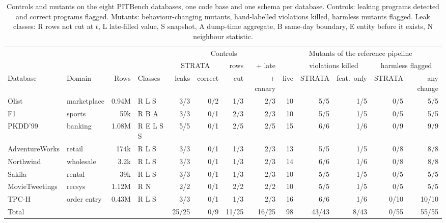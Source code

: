 \documentclass[10pt,conference]{IEEEtran}
\newcommand{\tool}{STRATA}
\begin{document}
\begin{table}[t]
\centering\footnotesize
\setlength{\tabcolsep}{4.5pt}
\caption{Controls and mutants on the eight PITBench databases, one code
base and one schema per database. Controls: leaking programs detected and
correct programs flagged. Mutants: behaviour-changing mutants, hand-labelled
violations killed, harmless mutants flagged. Leak classes: R rows not cut at
$t$, L late-filled value, S snapshot, A dump-time aggregate, B same-day
boundary, E entity before it exists, N neighbour statistic.}
\label{tab:pitbench}
\begin{tabular}{@{}llrl rrrr r rr rr@{}}
\toprule
& & & & \multicolumn{4}{c}{Controls} & \multicolumn{5}{c}{Mutants of the reference pipeline} \\
\cmidrule(lr){5-8}\cmidrule(l){9-13}
& & & & \multicolumn{2}{c}{\tool} & rows & + late & & \multicolumn{2}{c}{violations killed} & \multicolumn{2}{c}{harmless flagged} \\
\cmidrule(lr){5-6}\cmidrule(lr){10-11}\cmidrule(l){12-13}
Database & Domain & Rows & Classes & leaks & correct & cut & + canary & live & \tool & feat.\ only & \tool & any change \\
\midrule
Olist          & marketplace  & 0.94M & R L S       & 3/3 & 0/2 & 1/3  & 2/3  & 10 & 5/5   & 1/5  & 0/5  & 5/5   \\
F1             & sports       & 59k   & R B A       & 3/3 & 0/1 & 2/3  & 2/3  & 10 & 5/5   & 1/5  & 0/5  & 5/5   \\
PKDD'99        & banking      & 1.08M & R E L S S   & 5/5 & 0/1 & 2/5  & 2/5  & 15 & 6/6   & 1/6  & 0/9  & 9/9   \\
AdventureWorks & retail       & 174k  & R L S       & 3/3 & 0/1 & 1/3  & 2/3  & 13 & 5/5   & 1/5  & 0/8  & 8/8   \\
Northwind      & wholesale    & 3.2k  & R L S       & 3/3 & 0/1 & 1/3  & 2/3  & 14 & 6/6   & 1/6  & 0/8  & 8/8   \\
Sakila         & rental       & 39k   & R L S       & 3/3 & 0/1 & 1/3  & 2/3  & 10 & 5/5   & 1/5  & 0/5  & 5/5   \\
MovieTweetings & recsys       & 1.12M & R N         & 2/2 & 0/1 & 2/2  & 2/2  & 10 & 5/5   & 1/5  & 0/5  & 5/5   \\
TPC-H          & order entry  & 0.43M & R L S       & 3/3 & 0/1 & 1/3  & 2/3  & 16 & 6/6   & 1/6  & 0/10 & 10/10 \\
\midrule
Total          &              &       &             & 25/25 & 0/9 & 11/25 & 16/25 & 98 & 43/43 & 8/43 & 0/55 & 55/55 \\
\bottomrule
\end{tabular}
\end{table}
\end{document}
